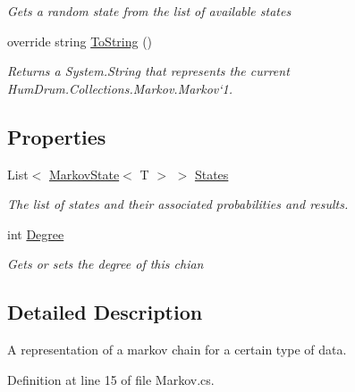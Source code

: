 \begin{DoxyCompactItemize}
\begin{DoxyCompactList}\small\item\em Gets a random state from the list of available states \end{DoxyCompactList}\item 
override string \hyperlink{classHumDrum_1_1Collections_1_1Markov_1_1Markov_a9386ce788662f10ba6d5cc0c7d564e29}{To\+String} ()
\begin{DoxyCompactList}\small\item\em Returns a System.\+String that represents the current Hum\+Drum.\+Collections.\+Markov.\+Markov`1. \end{DoxyCompactList}\end{DoxyCompactItemize}
\subsection*{Properties}
\begin{DoxyCompactItemize}
\item 
List$<$ \hyperlink{classHumDrum_1_1Collections_1_1Markov_1_1MarkovState}{Markov\+State}$<$ T $>$ $>$ \hyperlink{classHumDrum_1_1Collections_1_1Markov_1_1Markov_a71899515d7da8d3078ec114a7b622a5f}{States}
\begin{DoxyCompactList}\small\item\em The list of states and their associated probabilities and results. \end{DoxyCompactList}\item 
int \hyperlink{classHumDrum_1_1Collections_1_1Markov_1_1Markov_a35d0586c1f941ee548203a596378da81}{Degree}
\begin{DoxyCompactList}\small\item\em Gets or sets the degree of this chian \end{DoxyCompactList}\end{DoxyCompactItemize}


\subsection{Detailed Description}
A representation of a markov chain for a certain type of data. 



Definition at line 15 of file Markov.\+cs.



